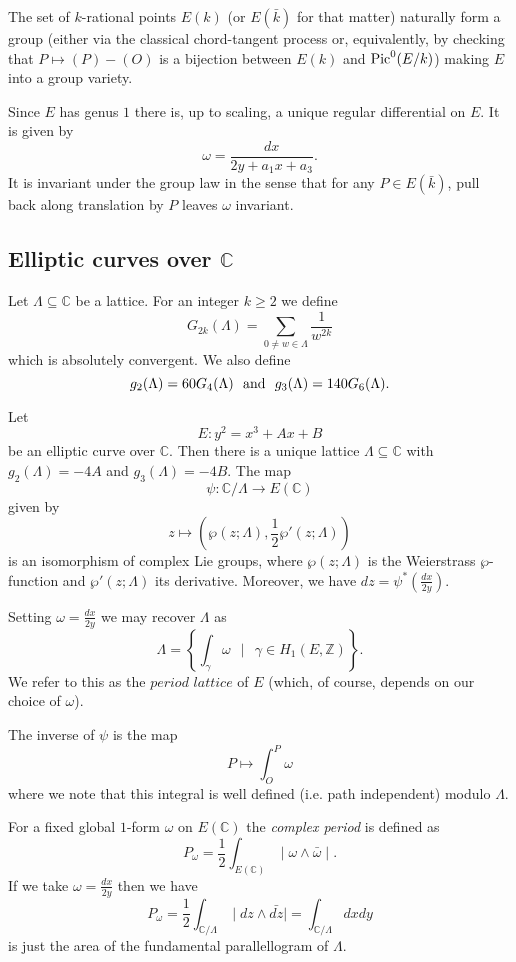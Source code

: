 \documentclass[12pt]{amsart}
\numberwithin{equation}{section}
\theoremstyle{remark}
\theoremstyle{definition}
\theoremstyle{definition}
\theoremstyle{definition}
\theoremstyle{definition}
\theoremstyle{definition}
\theoremstyle{definition}
\theoremstyle{definition}
\begin{document}
The set of $k$-rational points $E(k)$ (or $E(\bar{k})$ for that matter) naturally form a group (either via the classical chord-tangent process or, equivalently, by checking that $P\mapsto (P)-(O)$ is a bijection between $E(k)$ and $\textup{Pic}^0(E/k)$) making $E$ into a group variety.

Since $E$ has genus $1$ there is, up to scaling, a unique regular differential on $E$. It is given by
\[\omega=\frac{dx}{2y+a_1x+a_3}.\]
It is invariant under the group law in the sense that for any $P\in E(\bar{k})$, pull back along translation by $P$ leaves $\omega$ invariant.

\subsection{Elliptic curves over $\mathbb{C}$}

Let $\Lambda\subseteq \mathbb{C}$ be a lattice. For an integer $k\geq 2$ we define
\[G_{2k}(\Lambda)=\sum_{0\neq w\in \Lambda}\frac{1}{w^{2k}}\]
which is absolutely convergent. We also define \[g_2(\Lambda)=60G_4(\Lambda)~~\textup{and}~~g_3(\Lambda)=140G_6(\Lambda).\]

Let \[E:y^2=x^3+Ax+B\] be an elliptic curve over $\mathbb{C}$. Then there is a unique lattice $\Lambda\subseteq \mathbb{C}$ with $g_2(\Lambda)=-4A$ and $g_3(\Lambda)=-4B$. The map
\[\psi:\mathbb{C}/\Lambda \rightarrow E(\mathbb{C})\]
given by 
\[z\mapsto \left(\wp(z;\Lambda),\frac{1}{2}\wp'(z;\Lambda)\right)\]
is an isomorphism of complex Lie groups, where $\wp(z;\Lambda)$ is the Weierstrass $\wp$-function and $\wp'(z;\Lambda)$ its derivative. Moreover, we have $dz=\psi^*(\frac{dx}{2y})$.

Setting $\omega=\frac{dx}{2y}$ we may recover $\Lambda$ as
\[\Lambda=\left\{\int_\gamma \omega~~\mid~~\gamma \in H_1(E,\mathbb{Z})\right\}.\]
We refer to this as the $\textit{period lattice}$ of $E$ (which, of course, depends on our choice of $\omega$).

The inverse of $\psi$ is the map
\[P\mapsto \int_{O}^P\omega\]
where we note that this integral is well defined (i.e. path independent) modulo $\Lambda$. 

For a fixed global $1$-form $\omega$ on $E(\mathbb{C})$ the \textit{complex period} is defined as 
\[P_\omega=\frac{1}{2}\int_{E(\mathbb{C})}\mid \omega \wedge \bar{\omega}\mid.\]
If we take $\omega =\frac{dx}{2y}$ then we have
\[P_\omega=\frac{1}{2}\int_{\mathbb{C}/\Lambda}\mid dz\wedge \bar{dz} \mid=\int_{\mathbb{C}/\Lambda}dxdy\]
is just the area of the fundamental parallellogram of $\Lambda$. 
\end{document}
